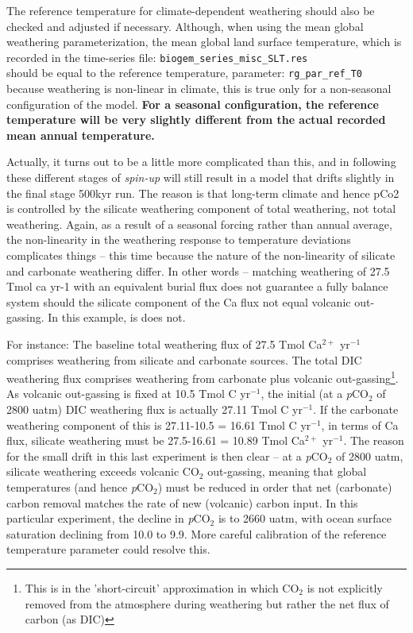 \documentclass[10pt,twoside]{article}
\begin{document}
The reference temperature for climate-dependent weathering should also be checked and adjusted if necessary. Although, when using the mean global weathering parameterization, the mean global land surface temperature, which is recorded in the time-series file:
\texttt{biogem\_series\_misc\_SLT.res}
\\should be equal to the reference temperature, parameter:
\texttt{rg\_par\_ref\_T0}
\\because weathering is non-linear in climate, this is true only for a non-seasonal configuration of the model. \textbf{For a seasonal configuration, the reference temperature will be very slightly different from the actual recorded mean annual temperature.}

Actually, it turns out to be a little more complicated than this, and in following these different stages of \textit{spin-up} will still result in a model that drifts slightly in the final stage 500kyr run. The reason is that long-term climate and hence pCo2 is controlled by the silicate weathering component of total weathering, not total weathering. Again, as a result of a seasonal forcing rather than annual average, the non-linearity in the weathering response to temperature deviations complicates things -- this time because the nature of the non-linearity of silicate and carbonate weathering differ. In other words -- matching weathering of 27.5 Tmol ca yr-1 with an equivalent burial flux does not guarantee a fully balance system should the silicate component of the Ca flux not equal volcanic out-gassing. In this example, is does not.

For instance: The baseline total weathering flux of 27.5 Tmol Ca$^{2+}$ yr$^{-1}$ comprises weathering from silicate and carbonate sources. The total DIC weathering flux comprises weathering from carbonate plus volcanic out-gassing\footnote{This is in the 'short-circuit' approximation in which CO$_{2}$ is not explicitly removed from the atmosphere during weathering but rather the net flux of carbon (as DIC)}. As volcanic out-gassing is fixed at 10.5 Tmol C yr$^{-1}$, the initial (at a \textit{p}CO${_2}$ of 2800 uatm) DIC weathering flux is actually 27.11 Tmol C yr$^{-1}$. If the carbonate weathering component of this is 27.11-10.5 = 16.61 Tmol C yr$^{-1}$, in terms of Ca flux, silicate weathering must be 27.5-16.61 = 10.89 Tmol Ca$^{2+}$ yr$^{-1}$. The reason for the small drift in this last experiment is then clear -- at a \textit{p}CO${_2}$ of 2800 uatm, silicate weathering exceeds volcanic CO$_{2}$ out-gassing, meaning that global temperatures (and hence \textit{p}CO${_2}$) must be reduced in order that net (carbonate) carbon removal matches the rate of new (volcanic) carbon input. In this particular experiment, the decline in \textit{p}CO${_2}$ is to 2660 uatm, with ocean surface saturation declining from 10.0 to 9.9. More careful calibration of the reference temperature parameter could resolve this.
\end{document}
